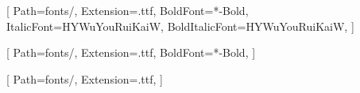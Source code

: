[%
    Path=fonts/,
    Extension=.ttf,
    BoldFont=*-Bold,
    ItalicFont=HYWuYouRuiKaiW,
    BoldItalicFont=HYWuYouRuiKaiW,
]

[
    Path=fonts/,
    Extension=.ttf,
    BoldFont=*-Bold,
]

[
    Path=fonts/,
    Extension=.ttf,
]
